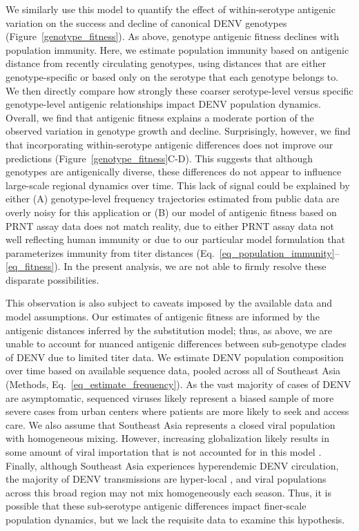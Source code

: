 \documentclass[11pt,oneside,letterpaper]{article}
\begin{document}
We similarly use this model to quantify the effect of within-serotype antigenic variation on the success and decline of canonical DENV genotypes (Figure~\ref{genotype_fitness}).
As above, genotype antigenic fitness declines with population immunity.
Here, we estimate population immunity based on antigenic distance from recently circulating genotypes, using distances that are either genotype-specific or based only on the serotype that each genotype belongs to.
We then directly compare how strongly these coarser serotype-level versus specific genotype-level antigenic relationships impact DENV population dynamics.
Overall, we find that antigenic fitness explains a moderate portion of the observed variation in genotype growth and decline.
Surprisingly, however, we find that incorporating within-serotype antigenic differences does not improve our predictions (Figure~\ref{genotype_fitness}C-D).
This suggests that although genotypes are antigenically diverse, these differences do not appear to influence large-scale regional dynamics over time.
This lack of signal could be explained by either (A) genotype-level frequency trajectories estimated from public data are overly noisy for this application or (B) our model of antigenic fitness based on PRNT assay data does not match reality, due to either PRNT assay data not well reflecting human immunity or due to our particular model formulation that parameterizes immunity from titer distances (Eq.~\ref{eq_population_immunity}--\ref{eq_fitness}).
In the present analysis, we are not able to firmly resolve these disparate possibilities.

This observation is also subject to caveats imposed by the available data and model assumptions.
Our estimates of antigenic fitness are informed by the antigenic distances inferred by the substitution model; thus, as above, we are unable to account for nuanced antigenic differences between sub-genotype clades of DENV due to limited titer data.
We estimate DENV population composition over time based on available sequence data, pooled across all of Southeast Asia (Methods, Eq.~\ref{eq_estimate_frequency}).
As the vast majority of cases of DENV are asymptomatic, sequenced viruses likely represent a biased sample of more severe cases from urban centers where patients are more likely to seek and access care.
We also assume that Southeast Asia represents a closed viral population with homogeneous mixing.
However, increasing globalization likely results in some amount of viral importation that is not accounted for in this model \citep{allicock2012phylogeography}.
Finally, although Southeast Asia experiences hyperendemic DENV circulation, the majority of DENV transmissions are hyper-local \citep{salje2017dengue}, and viral populations across this broad region may not mix homogeneously each season.
Thus, it is possible that these sub-serotype antigenic differences impact finer-scale population dynamics, but we lack the requisite data to examine this hypothesis.
\end{document}
